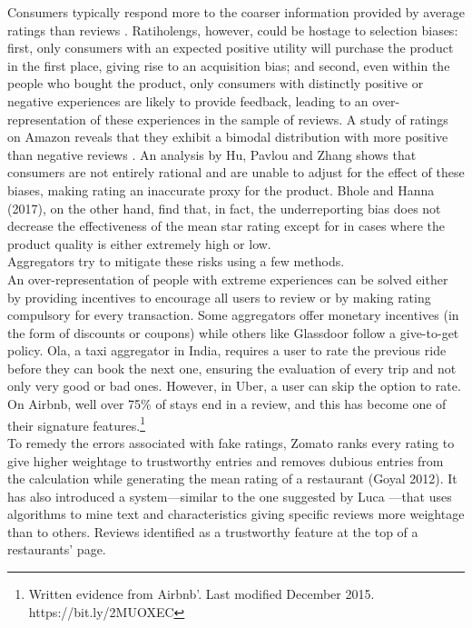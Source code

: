 \documentclass[a4paper, 12pt]{article}
\begin{document}
Consumers typically respond more to the coarser information provided by average ratings than reviews \parencite{dai2012optimal}. Ratiholengs, however, could be hostage to selection biases: first, only consumers with an expected positive utility will purchase the product in the first place, giving rise to an acquisition bias; and second, even within the people who bought the product, only consumers with distinctly positive or negative experiences are likely to provide feedback, leading to an over-representation of these experiences in the sample of reviews. A study of ratings on Amazon reveals that they exhibit a bimodal distribution with more positive than negative reviews \parencite{luca2016fake}. An analysis by Hu, Pavlou and Zhang \parencite{hu2017self}  shows that consumers are not entirely rational and are unable to adjust for the effect of these biases, making rating an inaccurate proxy for the product. Bhole and Hanna (2017), on the other hand, find that, in fact, the underreporting bias does not decrease the effectiveness of the mean star rating except for in cases where the product quality is either extremely high or low.\\

Aggregators try to mitigate these risks using a few methods.\\

An over-representation of people with extreme experiences can be solved either by providing incentives to encourage all users to review or by making rating compulsory for every transaction. Some aggregators offer monetary incentives (in the form of discounts or coupons) while others like Glassdoor follow a give-to-get policy. Ola, a taxi aggregator in India, requires a user to rate the previous ride before they can book the next one, ensuring the evaluation of every trip and not only very good or bad ones. However, in Uber, a user can skip the option to rate. On Airbnb, well over 75\% of stays end in a review, and this has become one of their signature features.\footnote { Written evidence from Airbnb’. Last modified December 2015. https://bit.ly/2MUOXEC} \\

To remedy the errors associated with fake ratings, Zomato ranks every rating to give higher weightage to trustworthy entries and removes dubious entries from the calculation while generating the mean rating of a restaurant (Goyal 2012). It has also introduced a system—similar to the one suggested by Luca \parencite{luca2016reviews}—that uses algorithms to mine text and characteristics giving specific reviews more weightage than to others. Reviews identified as a trustworthy feature at the top of a restaurants’ page. \\
\end{document}
